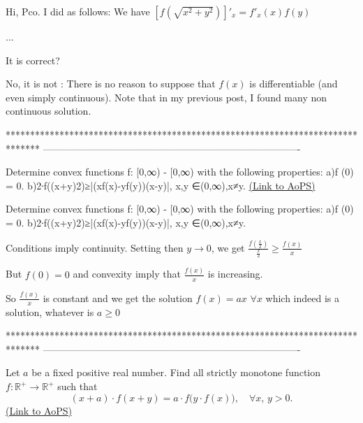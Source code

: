 \begin{solution}
	\begin{tcolorbox}Hi, Pco. I did as follows:
We have $\left[ f\left(\sqrt{x^2+y^2}\right) \right]'_x = f'_x(x)f(y) $

...

It is correct?\end{tcolorbox}
No, it is not : There is no reason to suppose that $f(x)$ is differentiable (and even simply continuous). Note that in my previous post, I found many non continuous solution.
\end{solution}
*******************************************************************************
-------------------------------------------------------------------------------

\begin{problem}
	Determine convex functions f: [0,∞) - [0,∞) with the following properties: 
a)f (0) = 0.
b)2∙f((x+y)\/2)≥|(xf(x)-yf(y))\/(x-y)|, x,y ∈(0,∞),x≠y.
	\flushright \href{https://artofproblemsolving.com/community/c6h580511}{(Link to AoPS)}
\end{problem}



\begin{solution}
	\begin{tcolorbox}Determine convex functions f: [0,∞) - [0,∞) with the following properties: 
a)f (0) = 0.
b)2∙f((x+y)\/2)≥|(xf(x)-yf(y))\/(x-y)|, x,y ∈(0,∞),x≠y.\end{tcolorbox}
Conditions imply continuity. Setting then $y\to 0$, we get $\frac{f(\frac x2)}{\frac x2}\ge \frac{f(x)}x$

But $f(0)=0$ and convexity imply that $\frac{f(x)}x$ is increasing.

So $\frac{f(x)}x$ is constant and we get the solution $\boxed{f(x)=ax}$ $\forall x$ which indeed is a solution, whatever is $a\ge 0$
\end{solution}
*******************************************************************************
-------------------------------------------------------------------------------

\begin{problem}
	Let $a$ be a fixed positive real number. Find all strictly monotone function $f: \mathbb R^+ \to \mathbb R^+$ such that \[(x+a)\cdot f(x+y)=a\cdot f\big(y\cdot f(x)\big),\quad \forall x,\,y >0.\]
	\flushright \href{https://artofproblemsolving.com/community/c6h580575}{(Link to AoPS)}
\end{problem}



